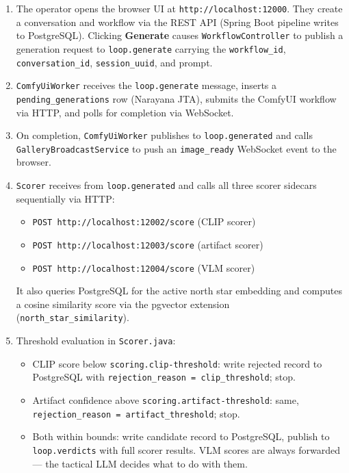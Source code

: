 \documentclass[11pt,letterpaper]{article}
\begin{document}
\begin{enumerate}
  \item The operator opens the browser UI at \texttt{http://localhost:12000}.
        They create a conversation and workflow via the REST API (Spring Boot
        pipeline writes to PostgreSQL). Clicking \textbf{Generate} causes
        \texttt{WorkflowController} to publish a generation request to
        \texttt{loop.generate} carrying the \texttt{workflow\_id},
        \texttt{conversation\_id}, \texttt{session\_uuid}, and prompt.

  \item \texttt{ComfyUiWorker} receives the \texttt{loop.generate} message,
        inserts a \texttt{pending\_generations} row (Narayana JTA), submits
        the ComfyUI workflow via HTTP, and polls for completion via WebSocket.

  \item On completion, \texttt{ComfyUiWorker} publishes to
        \texttt{loop.generated} and calls \texttt{GalleryBroadcastService}
        to push an \texttt{image\_ready} WebSocket event to the browser.

  \item \texttt{Scorer} receives from \texttt{loop.generated} and calls all
        three scorer sidecars sequentially via HTTP:
        \begin{itemize}
          \item \texttt{POST http://localhost:12002/score} (CLIP scorer)
          \item \texttt{POST http://localhost:12003/score} (artifact scorer)
          \item \texttt{POST http://localhost:12004/score} (VLM scorer)
        \end{itemize}
        It also queries PostgreSQL for the active north star embedding and
        computes a cosine similarity score via the pgvector extension
        (\texttt{north\_star\_similarity}).

  \item Threshold evaluation in \texttt{Scorer.java}:
    \begin{itemize}
      \item CLIP score below \texttt{scoring.clip-threshold}: write rejected
            record to PostgreSQL with \texttt{rejection\_reason = clip\_threshold}; stop.
      \item Artifact confidence above \texttt{scoring.artifact-threshold}: same,
            \texttt{rejection\_reason = artifact\_threshold}; stop.
      \item Both within bounds: write candidate record to PostgreSQL, publish
            to \texttt{loop.verdicts} with full scorer results. VLM scores are
            always forwarded --- the tactical LLM decides what to do with them.
    \end{itemize}


\end{enumerate}
\end{document}
